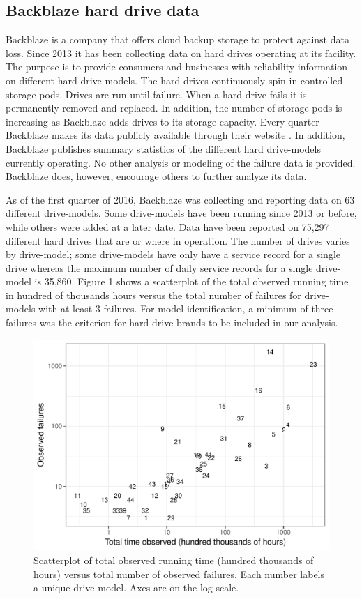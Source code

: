 \documentclass[12pt]{article}
\begin{document}
\subsection{Backblaze hard drive data}
Backblaze is a company that offers cloud backup storage to protect against data loss.  Since 2013 it has been collecting data on hard drives operating at its facility.  The purpose is to provide consumers and businesses with reliability information on different hard drive-models.  The hard drives continuously spin in controlled storage pods.  Drives are run until failure.  When a hard drive fails it is permanently removed and replaced.  In addition, the number of storage pods is increasing as Backblaze adds drives to its storage capacity.  Every quarter Backblaze makes its data publicly available through their website \citep{backblaze}. In addition, Backblaze publishes summary statistics of the different hard drive-models currently operating.  No other analysis or modeling of the failure data is provided.  Backblaze does, however, encourage others to further analyze its data. 

As of the first quarter of 2016, Backblaze was collecting and reporting data on 63 different drive-models.  Some drive-models have been running since 2013 or before, while others were added at a later date.  Data have been reported on 75,297 different hard drives that are or where in operation.  The number of drives varies by drive-model; some drive-models have only have a service record for a single drive whereas the maximum number of daily service records for a single drive-model is 35,860.  Figure 1 shows a scatterplot of the total observed running time in hundred of thousands hours versus the total number of failures for drive-models with at least 3 failures.  For model identification, a minimum of three failures was the criterion for hard drive brands to be included in our analysis.  

\begin{figure}[H]
  \includegraphics[width=.9\textwidth]{dm-summ-scatter.pdf}
  \caption{Scatterplot of total observed running time (hundred thousands of hours) versus total number of observed failures.  Each number labels a unique drive-model.   Axes are on the log scale.}
  \label{drive-scatter}
\end{figure}
\end{document}
